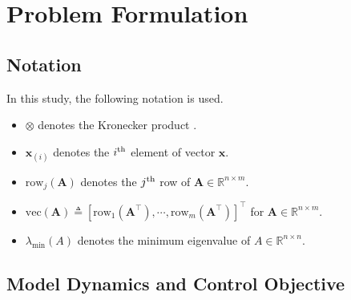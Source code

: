 \documentclass[letterpaper, 10 pt, conference]{ieeeconf}  %
\newcommand*{\mv}[1]{\boldsymbol{#1}}
\newcommand*{\mm}[1]{\boldsymbol{#1}}
\begin{document}
\section{Problem Formulation}\label{sec: Problem Formulation}

\subsection{Notation}
In this study, the following notation is used.

\begin{itemize}
    \item $\otimes$ denotes the Kronecker product \cite{RN22}.
    \item $\mv x_{(i)}$ denotes the $i\textsuperscript{th}$ element of vector $\mv x$.    
    \item $\text{row}_j(\mm A)$ denotes the $j\textsuperscript{th}$ row of $\mm A\in\mathbb{R}^{n\times m}$. 
    \item $\text{vec}(\mm A)\triangleq [\text{row}_1(\mm A^\top )  ,\cdots,\text{row}_m(\mm A^\top )]^\top $ for $\mm A\in\mathbb{R}^{n\times m}$.
    \item $\lambda_\text{min}(A)$ denotes the minimum eigenvalue of $A\in\mathbb{R}^{n\times n}$.
\end{itemize}

\subsection{Model Dynamics and Control Objective}
\end{document}
